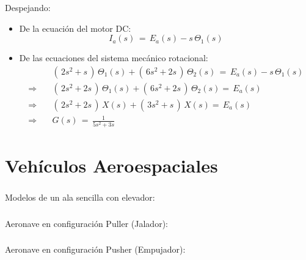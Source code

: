 \documentclass[ 10pt, xcolor = dvipsnames]{beamer}
\begin{document}
\begin{frame}[allowframebreaks]
Despejando: 
\begin{itemize}
\item De la ecuaci\'on del motor DC: 
\[
I_a(s) \, = \, E_a(s) - s \, \Theta_1(s)
\]
\item De las ecuaciones del sistema mec\'anico rotacional: 
\begin{align*}
& ( \, 2 s^2 + s \, ) \, \Theta_1(s) + 
( \, 6 s^2 + 2 s \, ) \, \Theta_2(s) \, = \,
E_a(s) - s \, \Theta_1(s) \\[1ex]
\Longrightarrow \quad
& ( \, 2 s^2 + 2 s \, ) \, \Theta_1(s) + 
( \, 6 s^2 + 2 s \, ) \, \Theta_2(s) = \, E_a(s) \\[1ex]
\Longrightarrow \quad
& ( \, 2 s^2 + 2 s \, ) \, X(s) + 
( \, 3 s^2 + s \, ) \, X(s) = \, E_a(s) \\[1ex]
\Longrightarrow \quad
& G(s) \, = \, \frac{1}{ 5 s^2 + 3s }
\end{align*}
\end{itemize}

\end{frame}

\section{Veh\'iculos Aeroespaciales}

\begin{frame}[allowframebreaks]
\frametitle{\insertsection}

Modelos de un ala sencilla con elevador:
\begin{figure}[htb]
\centering
\def\svgwidth{0.9\columnwidth}

\end{figure}

\end{frame}

\begin{frame}[allowframebreaks]
\frametitle{\insertsection}

Aeronave en configuraci\'on Puller (Jalador): 
\begin{figure}[htb]
\centering
\def\svgwidth{\columnwidth}

\end{figure}

\end{frame}

\begin{frame}[allowframebreaks]
\frametitle{\insertsection}

Aeronave en configuraci\'on Pusher (Empujador): 
\begin{figure}[htb]
\centering
\def\svgwidth{\columnwidth}

\end{figure}

\end{frame}
\end{document}
